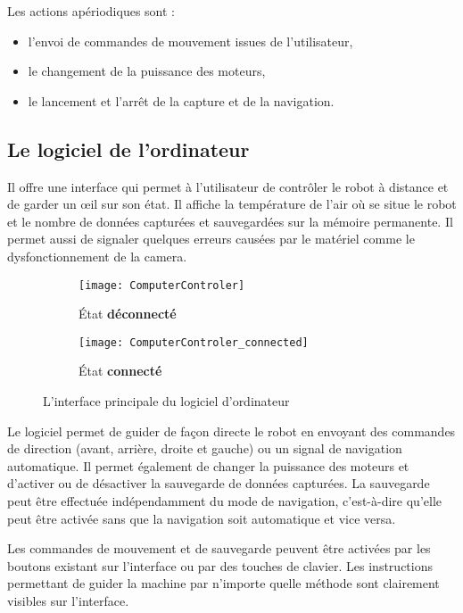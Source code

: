 \bigskip

Les actions apériodiques sont :
\begin{itemize}
  \item l'envoi de commandes de mouvement issues de l'utilisateur,
  \item le changement de la puissance des moteurs,
  \item le lancement et l'arrêt de la capture et de la navigation.
\end{itemize}

\subsection{Le logiciel de l'ordinateur}

Il offre une interface qui permet à l'utilisateur
de contrôler le robot à distance et de garder un œil sur son état. Il affiche la
température de l'air où se situe le robot et le nombre de données capturées et
sauvegardées sur la mémoire permanente. Il permet aussi de signaler quelques
erreurs causées par le matériel comme le dysfonctionnement de la camera.

\begin{figure}[h]
\begin{center}
  \begin{subfigure}{0.4\textwidth}
    \texttt{[image: ComputerControler]}
    \caption{\'Etat \textbf{déconnecté}}
  \end{subfigure}
  \hspace{2em}
  \begin{subfigure}{0.4\textwidth}
    \texttt{[image: ComputerControler\_connected]}
    \caption{\'Etat \textbf{connecté}}
  \end{subfigure}
  \caption{L'interface principale du logiciel d'ordinateur}
\end{center}
\end{figure}

Le logiciel permet de guider de façon directe le robot en envoyant des commandes
de direction (avant, arrière, droite et gauche) ou un signal de
navigation automatique. Il permet également de changer la puissance des moteurs
et d'activer ou de désactiver la sauvegarde de données capturées.
La sauvegarde peut être effectuée indépendamment
du mode de navigation, c'est-à-dire qu'elle peut être activée sans que la
navigation soit automatique et vice versa.

Les commandes de mouvement et de sauvegarde peuvent être activées par les
boutons existant sur l'interface ou par des touches de clavier. Les instructions
permettant de guider la machine par n'importe quelle méthode sont clairement visibles
sur l'interface.

